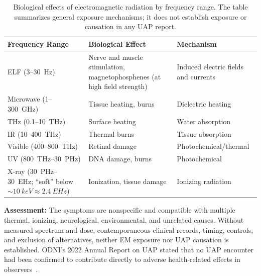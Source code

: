 \documentclass[aps,prd,twocolumn,superscriptaddress,nofootinbib,floatfix]{revtex4-2}
\begin{document}
\begin{table}[t]
\caption{Biological effects of electromagnetic radiation by frequency range. The
table summarizes general exposure mechanisms; it does not establish exposure or
causation in any UAP report.}
\label{tab:bio-effects}
\begin{tabular}{@{}lll@{}}
\toprule
\parbox[t]{0.3\textwidth}{\strut Frequency Range\strut} & \parbox[t]{0.38\textwidth}{\strut Biological Effect\strut} & \parbox[t]{0.24\textwidth}{\strut Mechanism\strut} \\
\midrule
\parbox[t]{0.3\textwidth}{\strut ELF (3--\SI{30}{Hz})\strut} & \parbox[t]{0.38\textwidth}{\strut Nerve and muscle stimulation, magnetophosphenes (at high
  field strength)\strut} & \parbox[t]{0.24\textwidth}{\strut Induced electric fields and currents\strut} \\
\parbox[t]{0.3\textwidth}{\strut Microwave (1--\SI{300}{GHz})\strut} & \parbox[t]{0.38\textwidth}{\strut Tissue heating, burns\strut} & \parbox[t]{0.24\textwidth}{\strut Dielectric heating\strut} \\
\parbox[t]{0.3\textwidth}{\strut THz (0.1--\SI{10}{THz})\strut} & \parbox[t]{0.38\textwidth}{\strut Surface heating\strut} & \parbox[t]{0.24\textwidth}{\strut Water absorption\strut} \\
\parbox[t]{0.3\textwidth}{\strut IR (10--\SI{400}{THz})\strut} & \parbox[t]{0.38\textwidth}{\strut Thermal burns\strut} & \parbox[t]{0.24\textwidth}{\strut Tissue absorption\strut} \\
\parbox[t]{0.3\textwidth}{\strut Visible (400--\SI{800}{THz})\strut} & \parbox[t]{0.38\textwidth}{\strut Retinal damage\strut} & \parbox[t]{0.24\textwidth}{\strut Photochemical/thermal\strut} \\
\parbox[t]{0.3\textwidth}{\strut UV (\SI{800}{THz}--\SI{30}{PHz})\strut} & \parbox[t]{0.38\textwidth}{\strut DNA damage, burns\strut} & \parbox[t]{0.24\textwidth}{\strut Photochemical\strut} \\
\parbox[t]{0.3\textwidth}{\strut X-ray (\SI{30}{PHz}--\SI{30}{EHz}; ``soft'' below
  ${\sim}\SI{10}{keV}\approx\SI{2.4}{EHz}$)\strut} & \parbox[t]{0.38\textwidth}{\strut Ionization, tissue damage\strut} &
  \parbox[t]{0.24\textwidth}{\strut Ionizing radiation\strut} \\
\bottomrule
\end{tabular}
\end{table}

\textbf{Assessment:} The symptoms are nonspecific and compatible with multiple
thermal, ionizing, neurological, environmental, and unrelated causes. Without
measured spectrum and dose, contemporaneous clinical records, timing, controls, and
exclusion of alternatives, neither EM exposure nor UAP causation is established.
ODNI's 2022 Annual Report on UAP stated that no UAP encounter had been confirmed to
contribute directly to adverse health-related effects in
observers~\cite{ODNI2023,DIRD_Green}.
\end{document}
